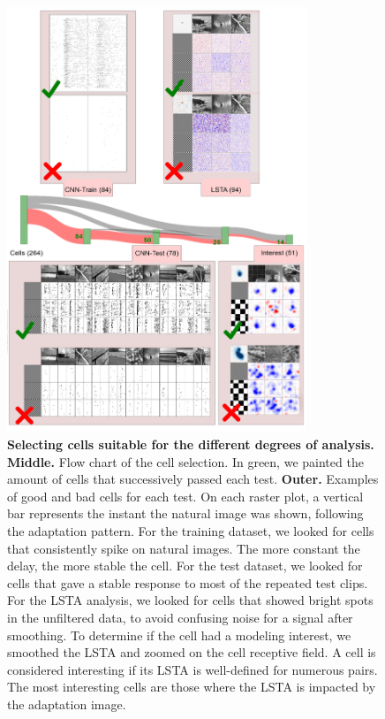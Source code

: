 \begin{figure}
    \centering
    \vspace*{-3cm}
    \includegraphics[width=0.8\textwidth]{pics/CellSelectionV2.png}
    \caption{\textbf{Selecting cells suitable for the different degrees
            of
            analysis.} \textbf{Middle.} Flow chart of the cell selection. In
        green, we painted the amount of cells that successively passed each test.
        \textbf{Outer.} Examples of good and
        bad cells
        for each test. On each raster plot, a vertical bar represents the
        instant the natural image was shown, following the adaptation pattern.
        For the
        training dataset, we looked for cells that
        consistently spike on natural images. The more constant the delay, the
        more
        stable the cell. For the test dataset, we looked for cells that gave a
        stable
        response to most of the repeated test clips. For the LSTA analysis, we
        looked
        for cells that showed bright spots in the unfiltered data, to avoid
        confusing
        noise for a signal after smoothing. To determine if the cell had a
        modeling
        interest, we smoothed the LSTA and zoomed on the cell receptive field.
        A cell
        is considered interesting if its LSTA is well-defined for numerous
        pairs. The
        most interesting cells are those where the LSTA is impacted by the
        adaptation
        image.}
    \label{fig:cell_selection}
\end{figure}

